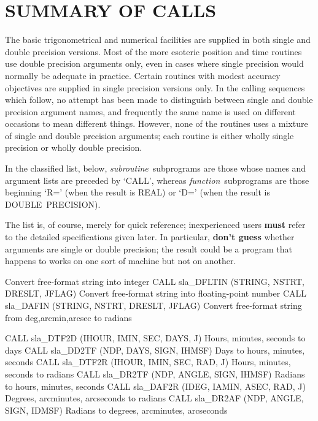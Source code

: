 \section{SUMMARY OF CALLS}
The basic trigonometrical and numerical facilities are supplied in both single
and double precision versions.
Most of the more esoteric position and time routines use double precision
arguments only, even in cases where single precision would normally be adequate
in practice.
Certain routines with modest accuracy objectives are supplied in
single precision versions only.
In the calling sequences which follow, no attempt has been made
to distinguish between single and double precision argument names,
and frequently the same name is used on different occasions to
mean different things.
However, none of the routines uses a mixture of single and
double precision arguments;  each routine is either wholly
single precision or wholly double precision.

In the classified list, below,
{\it subroutine}\, subprograms are those whose names and argument lists
are preceded by `CALL', whereas {\it function}\, subprograms are
those beginning `R=' (when the result is REAL) or `D=' (when
the result is DOUBLE~PRECISION).

The list is, of course, merely for quick reference;  inexperienced
users {\bf must} refer to the detailed specifications given later.
In particular, {\bf don't guess} whether arguments are single or
double precision; the result could be a program that happens to
works on one sort of machine but not on another.

\begin{callset}
   Convert free-format string into integer
     {CALL sla\_DFLTIN (STRING, NSTRT, DRESLT, JFLAG)}
   Convert free-format string into floating-point number
     {CALL sla\_DAFIN (STRING, NSTRT, DRESLT, JFLAG)}
   Convert free-format string from deg,arcmin,arcsec to radians
\end{callset}

\begin{callset}
     {CALL sla\_DTF2D (IHOUR, IMIN, SEC, DAYS, J)}
   Hours, minutes, seconds to days
     {CALL sla\_DD2TF (NDP, DAYS, SIGN, IHMSF)}
   Days to hours, minutes, seconds
     {CALL sla\_DTF2R (IHOUR, IMIN, SEC, RAD, J)}
   Hours, minutes, seconds to radians
     {CALL sla\_DR2TF (NDP, ANGLE, SIGN, IHMSF)}
   Radians to hours, minutes, seconds
     {CALL sla\_DAF2R (IDEG, IAMIN, ASEC, RAD, J)}
   Degrees, arcminutes, arcseconds to radians
     {CALL sla\_DR2AF (NDP, ANGLE, SIGN, IDMSF)}
   Radians to degrees, arcminutes, arcseconds
\end{callset}

